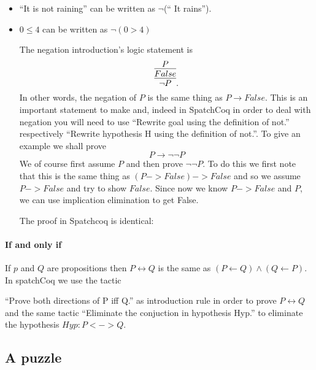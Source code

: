 \begin{itemize}
\item ``It is not raining'' can be written as $\neg$(`` It rains'').
\item $0\le 4$ can be  written as $\neg (0>4)$ 

The negation introduction's logic statement is
$$\infer{\neg P}{\infer{False}{P}}.$$
In other words, the negation of $P$ is the same thing as $P\rightarrow False$. This is an important statement to make and, indeed in SpatchCoq in order to deal with negation you will need to use ``Rewrite goal using the definition of not.'' respectively ``Rewrite hypothesis	H using the definition of not.''. To give an example we shall prove 
$$P \rightarrow \neg \neg P$$
We of course first assume $P$ and then prove $\neg \neg P$. To do this we first note that this is the same thing as $(P->False)->False$ and so we assume $P->False$ and try to show $False$. Since now we know $P->False$ and $P$, we can use implication elimination to get False.




The proof in Spatchcoq is identical:


\end{itemize}


\paragraph{\bf If and only if}

If $p$ and $Q$ are propositions then $P\leftrightarrow Q$ is the same as $(P\leftarrow Q) \land (Q\leftarrow P)$. In spatchCoq we use the tactic

``Prove both directions of P iff Q.''  as introduction rule in order to prove $P\leftrightarrow Q$ and the same tactic ``Eliminate the conjuction in hypothesis Hyp.'' to eliminate the hypothesis $Hyp: P<->Q$.



 



\subsection{A puzzle}

